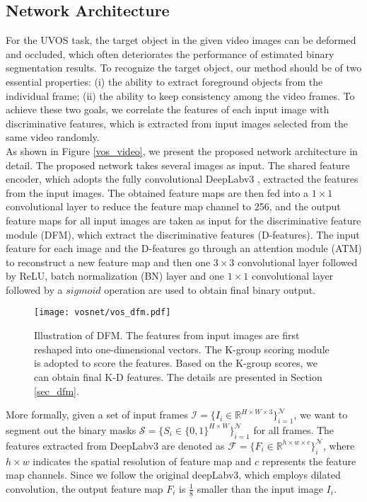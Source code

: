 \documentclass[runningheads]{llncs}
\begin{document}
\subsection{Network Architecture}\label{sec_vos_architecture}
For the UVOS task, the target object in the given video images can be deformed and occluded, which often deteriorates the performance of estimated binary segmentation results. To recognize the target object, our method should be of two essential properties: (i) the ability to extract foreground objects from the individual frame; (ii) the ability to keep consistency among the video frames. To achieve these two goals, we correlate the features of each input image with discriminative features, which is extracted from  input images selected from the same video randomly. \\
\indent As shown in Figure \ref{vos_video}, we present the proposed network architecture in detail. The proposed network takes several images as input. The shared feature encoder, which adopts the fully convolutional DeepLabv3 \cite{deeplabv3}, extracted the features from the input images. The obtained feature maps are then fed into a $1 \times 1$ convolutional layer to reduce the feature map channel to 256, and the output feature maps for all input images are taken as input for the discriminative feature module (DFM), which extract the discriminative features (D-features).  The input feature for each image and the D-features go through an attention module (ATM) to reconstruct a new feature map and then one $3 \times 3$ convolutional layer followed by ReLU, batch normalization (BN) layer and one $1 \times 1$ convolutional layer followed by a $sigmoid$ operation are used to obtain final binary output. \\
\begin{figure*}[t!]
	\centering
	\texttt{[image: vosnet/vos\_dfm.pdf]}
	\caption{Illustration of DFM. The features from input images are first reshaped into one-dimensional vectors. The K-group scoring module is adopted to score the features. Based on the K-group scores, we can obtain final K-D features. The details are presented in Section \ref{sec_dfm}.}
	\label{vos_dfm}
\end{figure*}
\indent More formally,  given a set of input frames $\mathcal{I}=\{I_i \in \mathbb{R}^{H \times W \times 3}\}_{i=1}^{\mathcal{N}}$, we want to segment out the binary masks $\mathcal{S}=\{S_i \in \{0, 1\}^{H \times W}\}_{i=1}^{\mathcal{N}}$ for all frames. The features extracted from DeepLabv3 are denoted as $\mathcal{F}=\{F_i \in \mathbb{R}^{h \times w \times c}\}_{i}^{\mathcal{N}}$, where $h \times w$ indicates the spatial resolution of feature map and $c$ represents the feature map channels. Since we follow the original deepLabv3, which employs dilated convolution, the output feature map $F_i$ is  $\frac{1}{8}$   smaller than the input image $I_i$. 
\end{document}
